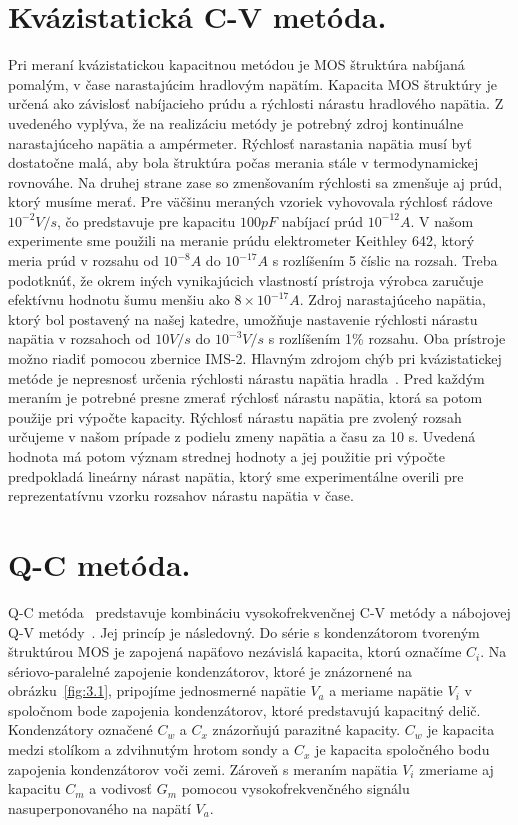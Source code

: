 \section{Kvázistatická C-V metóda.}\label{sec:3.2}

Pri meraní kvázistatickou kapacitnou metódou je MOS štruktúra nabíjaná
pomalým, v čase narastajúcim hradlovým napätím. Kapacita MOS štruktúry
je určená ako závislosť nabíjacieho prúdu a rýchlosti nárastu
hradlového napätia.  Z uvedeného vyplýva, že na realizáciu metódy je
potrebný zdroj kontinuálne narastajúceho napätia a
ampérmeter. Rýchlosť narastania napätia musí byť dostatočne malá, aby
bola štruktúra počas merania stále v termodynamickej rovnováhe. Na
druhej strane zase so zmenšovaním rýchlosti sa zmenšuje aj prúd, ktorý
musíme merať. Pre väčšinu meraných vzoriek vyhovovala rýchlosť rádove
$10^{-2}V/s$, čo predstavuje pre kapacitu $100pF$ nabíjací prúd
$10^{-12}A$. V našom experimente sme použili na meranie prúdu
elektrometer Keithley 642, ktorý meria prúd v rozsahu od $10^{-8}A$ do
$10^{-17}A$ s rozlíšením 5 číslic na rozsah.  Treba podotknúť, že
okrem iných vynikajúcich vlastností prístroja výrobca zaručuje
efektívnu hodnotu šumu menšiu ako $8\times10^{-17}A$. Zdroj
narastajúceho napätia, ktorý bol postavený na našej katedre, umožňuje
nastavenie rýchlosti nárastu napätia v rozsahoch od $10V/s$ do
$10^{-3}V/s$ s rozlíšením 1\% rozsahu. Oba prístroje možno riadiť
pomocou zbernice IMS-2.  Hlavným zdrojom chýb pri kvázistatickej
metóde je nepresnosť určenia rýchlosti nárastu napätia
hradla~\cite{1.5}. Pred každým meraním je potrebné presne zmerať
rýchlosť nárastu napätia, ktorá sa potom použije pri výpočte
kapacity. Rýchlosť nárastu napätia pre zvolený rozsah určujeme v našom
prípade z podielu zmeny napätia a času za 10 s.  Uvedená hodnota má
potom význam strednej hodnoty a jej použitie pri výpočte predpokladá
lineárny nárast napätia, ktorý sme experimentálne overili pre
reprezentatívnu vzorku rozsahov nárastu napätia v čase.

\section{Q-C metóda.}\label{sec:3.3}

Q-C metóda~\cite{3.4} predstavuje kombináciu vysokofrekvenčnej C-V
metódy a nábojovej Q-V metódy~\cite{3.5}. Jej princíp je následovný. Do
série s kondenzátorom tvoreným štruktúrou MOS je zapojená napäťovo
nezávislá kapacita, ktorú označíme $C_i$. Na sériovo-paralelné
zapojenie kondenzátorov, ktoré je znázornené na obrázku~\ref{fig:3.1},
pripojíme jednosmerné napätie $V_a$ a meriame napätie $V_i$ v
spoločnom bode zapojenia kondenzátorov, ktoré predstavujú kapacitný
delič. Kondenzátory označené $C_w$ a $C_x$ znázorňujú parazitné
kapacity. $C_w$ je kapacita medzi stolíkom a zdvihnutým hrotom sondy a
$C_x$ je kapacita spoločného bodu zapojenia kondenzátorov voči
zemi. Zároveň s meraním napätia $V_i$ zmeriame aj kapacitu $C_m$ a
vodivosť $G_m$ pomocou vysokofrekvenčného signálu nasuperponovaného na
napätí $V_a$.

